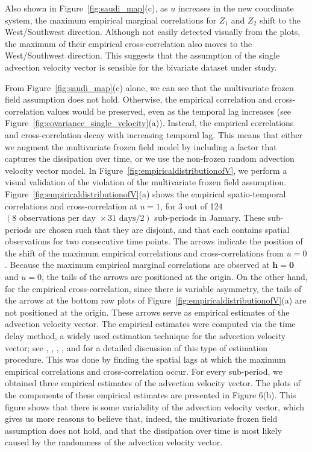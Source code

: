 \documentclass[12pt]{article}
\newcommand{\0}{\mathbf{0}}
\begin{document}
Also shown in Figure~\ref{fig:saudi_map}(c), as $u$ increases in the new coordinate system, the maximum empirical marginal correlations for $Z_1$ and $Z_2$ shift to the West/Southwest direction.  Although not easily detected visually from the plots, the maximum of their empirical cross-correlation also moves to the West/Southwest direction. This suggests that the assumption of the single advection velocity vector is sensible for the bivariate dataset under study. 

From Figure~\ref{fig:saudi_map}(c) alone, we can see that the multivariate frozen field assumption does not hold. Otherwise, the empirical correlation and cross-correlation values would be preserved, even as the temporal lag increases (see Figure~\ref{fig:covariance_single_velocity}(a)). Instead, the empirical correlations and cross-correlation decay with increasing temporal lag. This means that either we augment the multivariate frozen field model by including a factor that captures the dissipation over time, or we use the non-frozen random advection velocity vector model. In Figure~\ref{fig:empiricaldistributionofV}, we perform a visual validation of the violation of the multivariate frozen field assumption. Figure~\ref{fig:empiricaldistributionofV}(a) shows the empirical spatio-temporal correlations and cross-correlation at $u=1$, for 3 out of 124 $(8 \text{ observations per day } \times 31 \text{ days} / 2)$ sub-periods in January. These sub-periods are chosen such that they are disjoint, and that each contains spatial observations for two consecutive time points. The arrows indicate the position of the shift of the maximum empirical correlations and cross-correlations from $u=0$. Because the maximum empirical marginal correlations are observed at $\mathbf{h}=\mathbf{0}$ and $u=0$, the tails of the arrows are positioned at the origin. On the other hand, for the empirical cross-correlation, since there is variable asymmetry, the tails of the arrows at the bottom row plots of Figure~\ref{fig:empiricaldistributionofV}(a) are not positioned at the origin. These arrows serve as empirical estimates of the advection velocity vector. The empirical estimates were computed via the time delay method, a widely used estimation technique for the advection velocity vector; see \citet{seed1999space}, \citet{inoue2012spatio}, \citet{li2009statistical}, \citet{jamaly2018robust}, and \citet{russo2018spatial} for a detailed discussion of this type of estimation procedure. This was done by finding the spatial lags at which the maximum empirical correlations and cross-correlation occur. For every sub-period, we obtained three empirical estimates of the advection velocity vector. The plots of the components of these empirical estimates are presented in Figure 6(b). This figure shows that there is some variability of the advection velocity vector, which gives us more reasons to believe that, indeed, the multivariate frozen field assumption does not hold, and that the dissipation over time is most likely caused by the randomness of the advection velocity vector.
\end{document}
